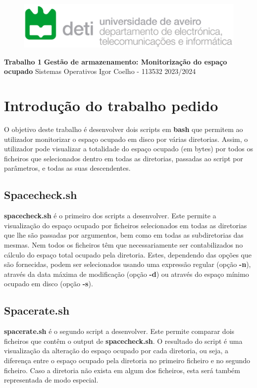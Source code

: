 \documentclass[11pt, a4paper]{report}
\begin{document}
\begin{figure}
    \Centering
    \includegraphics[width=12cm]{deti.png}
    \vskip 3cm
\end{figure}
\begin{center}
    \Centering
    \huge{\textbf{Trabalho 1}}
    \newline
    \huge{\textbf{Gestão de armazenamento: \newline Monitorização do espaço ocupado}}
    \vskip 1cm
    \large{Sistemas Operativos}
    \vskip 2cm
    \large{Igor Coelho - 113532}
    \vfill
    \large{2023/2024}
\end{center}
\thispagestyle{empty}
\tableofcontents
\chapter{Introdução do trabalho pedido}
O objetivo deste trabalho é desenvolver dois scripts em \textbf{bash} que permitem ao utilizador monitorizar o espaço ocupado em disco por várias diretorias. Assim, o utilizador pode visualizar a totalidade do espaço ocupado (em bytes) por todos os ficheiros que selecionados dentro em todas as diretorias, passadas ao script por parâmetros, e todas as suas descendentes.
\section{Spacecheck.sh}
\textbf{spacecheck.sh} é o primeiro dos scripts a desenvolver. Este permite a visualização do espaço ocupado por ficheiros selecionados em todas as diretorias que lhe são passadas por argumentos, bem como em todas as subdiretorias das mesmas. 
Nem todos os ficheiros têm que necessariamente ser contabilizados no cálculo do espaço total ocupado pela diretoria.
Estes, dependendo das opções que são fornecidas, podem ser selecionados usando uma expressão regular (opção \textbf{-n}), através da data máxima de modificação (opção \textbf{-d}) ou através do espaço mínimo ocupado em disco (opção \textbf{-s}).
\section{Spacerate.sh}
\textbf{spacerate.sh} é o segundo script a desenvolver. Este permite comparar dois ficheiros que contêm o output de \textbf{spacecheck.sh}. O resultado do script é uma visualização da alteração do espaço ocupado por cada diretoria, ou seja, a diferença entre o espaço ocupado pela diretoria no primeiro ficheiro e no segundo ficheiro. Caso a diretoria não exista em algum dos ficheiros, esta será também representada de modo especial.
\end{document}
